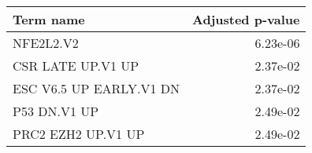 \begin{tabular}{lr}
\toprule
              Term name &  Adjusted p-value \\
\midrule
              NFE2L2.V2 &          6.23e-06 \\
      CSR LATE UP.V1 UP &          2.37e-02 \\
ESC V6.5 UP EARLY.V1 DN &          2.37e-02 \\
           P53 DN.V1 UP &          2.49e-02 \\
     PRC2 EZH2 UP.V1 UP &          2.49e-02 \\
\bottomrule
\end{tabular}
